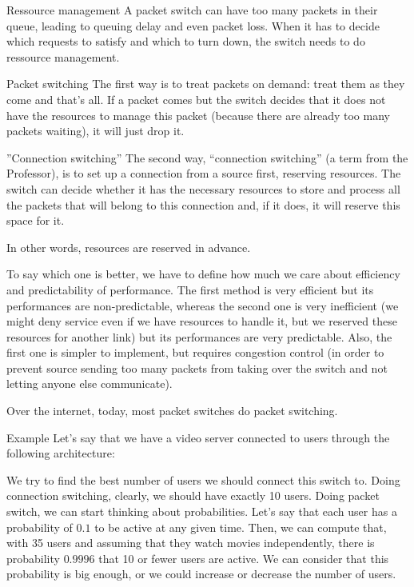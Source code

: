 \documentclass[a4paper]{article}
\begin{document}
\begin{parag}{Ressource management}
     A packet switch can have too many packets in their queue, leading to queuing delay and even packet loss. When it has to decide which requests to satisfy and which to turn down, the switch needs to do ressource management.

    \begin{subparag}{Packet switching}
        The first way is to treat packets on demand: treat them as they come and that's all. If a packet comes but the switch decides that it does not have the resources to manage this packet (because there are already too many packets waiting), it will just drop it.
    \end{subparag}

    \begin{subparag}{''Connection switching''}
        The second way, ``connection switching'' (a term from the Professor), is to set up a connection from a source first, reserving resources. The switch can decide whether it has the necessary resources to store and process all the packets that will belong to this connection and, if it does, it will reserve this space for it.

       In other words, resources are reserved in advance.
    \end{subparag}

    To say which one is better, we have to define how much we care about efficiency and predictability of performance. The first method is very efficient but its performances are non-predictable, whereas the second one is very inefficient (we might deny service even if we have resources to handle it, but we reserved these resources for another link) but its performances are very predictable. Also, the first one is simpler to implement, but requires congestion control (in order to prevent source sending too many packets from taking over the switch and not letting anyone else communicate).

    Over the internet, today, most packet switches do packet switching.
\end{parag}

\begin{parag}{Example}
    Let's say that we have a video server connected to users through the following architecture:

    We try to find the best number of users we should connect this switch to. Doing connection switching, clearly, we should have exactly 10 users. Doing packet switch, we can start thinking about probabilities. Let's say that each user has a probability of $0.1$ to be active at any given time. Then, we can compute that, with 35 users and assuming that they watch movies independently, there is probability $0.9996$ that 10 or fewer users are active. We can consider that this probability is big enough, or we could increase or decrease the number of users.
\end{parag}
\end{document}
